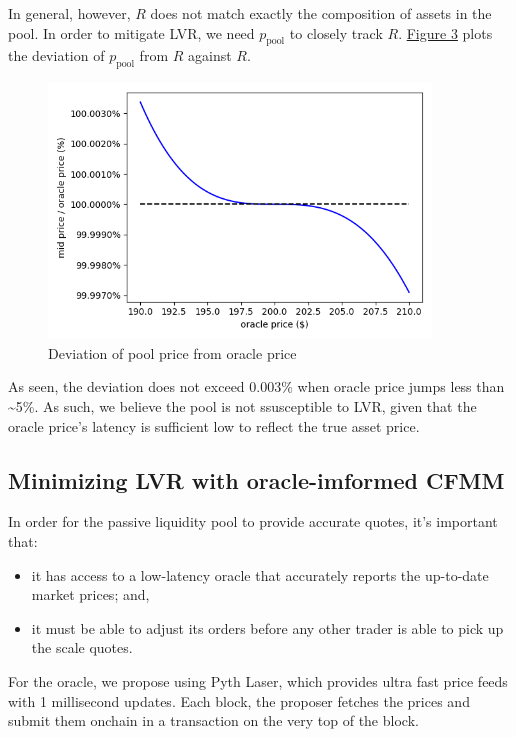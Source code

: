\documentclass{article}
\begin{document}
In general, however, $R$ does not match exactly the composition of assets in the pool. In order to mitigate LVR, we need $p_{\mathrm{pool}}$ to closely track $R$. \hyperref[fig:3]{Figure 3} plots the deviation of $p_{\mathrm{pool}}$ from $R$ against $R$.

\begin{figure}
  \centering
  \includegraphics[width=4in]{3-solidly-pool-price-vs-oracle.png}
  \caption{Deviation of pool price from oracle price}
  \label{fig:3}
\end{figure}

As seen, the deviation does not exceed 0.003\% when oracle price jumps less than \textasciitilde 5\%. As such, we believe the pool is not ssusceptible to LVR, given that the oracle price's latency is sufficient low to reflect the true asset price.

\subsection{Minimizing LVR with oracle-imformed CFMM}

In order for the passive liquidity pool to provide accurate quotes, it's important that:

\begin{itemize}
  \item it has access to a low-latency oracle that accurately reports the up-to-date market prices; and,
  \item it must be able to adjust its orders before any other trader is able to pick up the scale quotes.
\end{itemize}

For the oracle, we propose using Pyth Laser,\supercite{pythlaser} which provides ultra fast price feeds with 1 millisecond updates. Each block, the proposer fetches the prices and submit them onchain in a transaction on the very top of the block.
\end{document}
